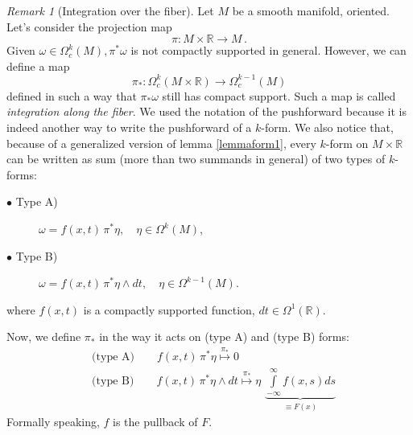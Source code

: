 \documentclass[a4paper,11pt,titlepage, article, oneside]{memoir}
\numberwithin{equation}{section}
\theoremstyle{definition}
\theoremstyle{remark}
\newtheorem{remark}[theorem]{Remark}
\newcommand{\rfield}{\mathbb{R}}
\begin{document}
\begin{remarkbox}
\begin{remark}[Integration over the fiber] \label{intfiberrem}
Let $M$ be a smooth manifold, oriented. Let's consider the projection map
\begin{equation}
\pi \colon M \times \rfield \rightarrow M \, .
\end{equation}
Given $\omega \in \Omega_c^k(M), \pi^*\omega$ is not compactly supported in general. However, we can define a map
\begin{equation}
\pi_* \colon \Omega_c^k(M \times \rfield) \rightarrow \Omega_c^{k-1}(M)
\end{equation}
defined in such a way that $\pi_* \omega$ still has compact support. Such a map is called \textit{integration along the fiber}. We used the notation of the pushforward because it is indeed another way to write the pushforward of a $k$-form.
We also notice that, because of a generalized version of lemma \ref{lemmaform1}, every $k$-form on $M \times \rfield$ can be written as sum (more than two summands in general) of two types of $k$-forms:
\begin{description}
\item[$\bullet $ Type A)] $\omega = f(x, t) \, \pi^* \eta, \quad \eta \in \Omega^k(M)$,
\item[$\bullet$ Type B)] $\omega = f(x, t)\, \pi^*\eta \wedge dt, \quad \eta \in \Omega^{k-1}(M)$.
\end{description}
where $f(x, t)$ is a compactly supported function, $dt \in \Omega^1(\rfield)$.

Now, we define $\pi_*$ in the way it acts on (type A) and (type B) forms:
\begin{align}
&\text{(type A)} \qquad  f(x, t) \, \pi^* \eta \overset{\pi_*}{\longmapsto}  0  \label{typea} \\
&\text{(type B)}\qquad  f(x,t) \, \pi^*\eta \wedge dt \overset{\pi_*}{\longmapsto} \eta \, \,  \underbrace{\int\limits_{-\infty}^{\infty} f(x, s) ds }_{\equiv F(x)}  \label{typeb}
\end{align}
Formally speaking, $f$ is the pullback of $F$.
\end{remark}
\end{remarkbox}
\end{document}
